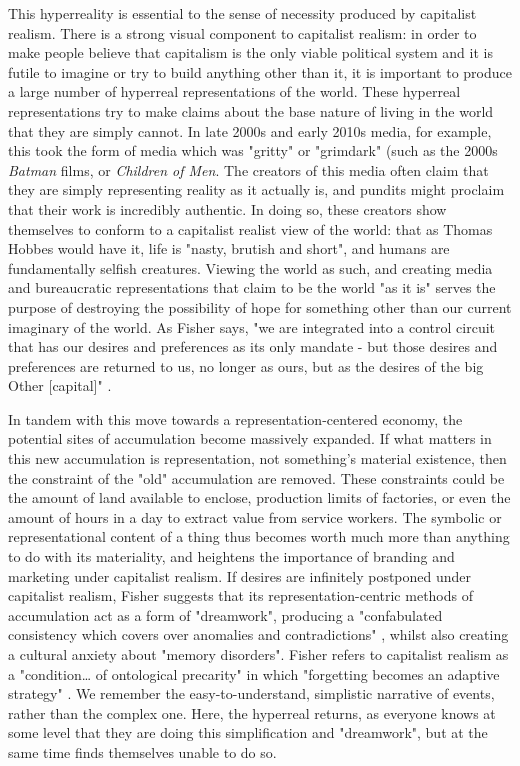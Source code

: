 This hyperreality is essential to the sense of necessity produced by capitalist realism. There is a strong visual component to capitalist realism: in order to make people believe that capitalism is the only viable political system and it is futile to imagine or try to build anything other than it, it is important to produce a large number of hyperreal representations of the world. These hyperreal representations try to make claims about the base nature of living in the world that they are simply cannot. In late 2000s and early 2010s media, for example, this took the form of media which was "gritty" or "grimdark" (such as the 2000s \textit{Batman} films, or \emph{Children of Men}. The creators of this media often claim that they are simply representing reality as it actually is, and pundits might proclaim that their work is incredibly authentic. In doing so, these creators show themselves to conform to a capitalist realist view of the world: that as Thomas Hobbes would have it, life is "nasty, brutish and short", and humans are fundamentally selfish creatures. Viewing the world as such, and creating media and bureaucratic representations that claim to be the world "as it is" serves the purpose of destroying the possibility of hope for something other than our current imaginary of the world. As Fisher says, "we are integrated into a control circuit that has our desires and preferences as its only mandate - but those desires and preferences are returned to us, no longer as ours, but as the desires of the big Other [capital]" \citep[53]{fisher_capitalist_2009}.

In tandem with this move towards a representation-centered economy, the potential sites of accumulation become massively expanded. If what matters in this new accumulation is representation, not something's material existence, then the constraint of the "old" accumulation are removed. These constraints could be the amount of land available to enclose, production limits of factories, or even the amount of hours in a day to extract value from service workers. The symbolic or representational content of a thing thus becomes worth much more than anything to do with its materiality, and heightens the importance of branding and marketing under capitalist realism. 
If desires are infinitely postponed under capitalist realism, Fisher suggests that its representation-centric methods of accumulation act as a form of "dreamwork", producing a "confabulated consistency which covers over anomalies and contradictions" \citep[64]{fisher_capitalist_2009}, whilst also creating a cultural anxiety about "memory disorders". Fisher refers to capitalist realism as a "condition\ldots{} of ontological precarity" in which "forgetting becomes an adaptive strategy" \citep[60]{fisher_capitalist_2009}. We remember the easy-to-understand, simplistic narrative of events, rather than the complex one.  Here, the hyperreal returns, as everyone knows at some level that they are doing this simplification and "dreamwork", but at the same time finds themselves unable to do so.

